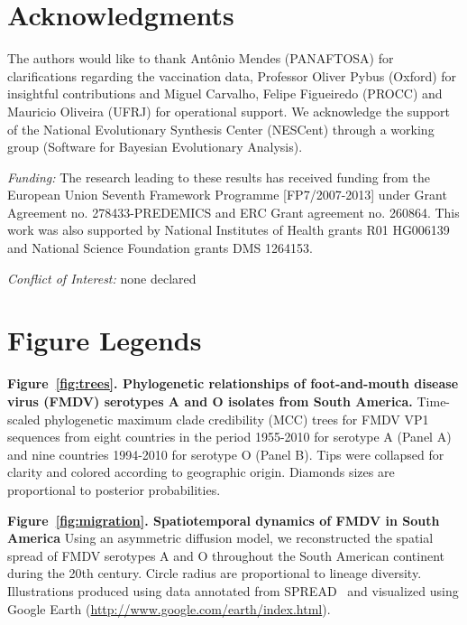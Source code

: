 \documentclass[10pt]{article}
\begin{document}
\section*{Acknowledgments}
The authors would like to thank Ant\^onio Mendes (PANAFTOSA) for clarifications regarding the vaccination data, Professor Oliver Pybus (Oxford) for insightful contributions and Miguel Carvalho, Felipe Figueiredo (PROCC) and Mauricio Oliveira (UFRJ) for operational support.
We acknowledge the support of the National Evolutionary Synthesis Center (NESCent) through a working group (Software for Bayesian Evolutionary Analysis).

\emph{Funding:} The research leading to these results has received funding from the European Union Seventh Framework Programme [FP7/2007-2013] under Grant Agreement no. 278433-PREDEMICS and ERC Grant agreement no. 260864.
This work was also supported by National Institutes of Health grants R01 HG006139 and National Science Foundation grants DMS 1264153.

\emph{Conflict of Interest:} none declared

\newpage

\newpage
\section*{Figure Legends}
{\bf Figure~\ref{fig:trees}. Phylogenetic relationships of foot-and-mouth disease virus (FMDV) serotypes A and O isolates from South America.} Time-scaled phylogenetic maximum clade credibility (MCC) trees for FMDV VP1 sequences from eight countries in the period 1955-2010 for serotype A (Panel A) and nine countries 1994-2010 for serotype O (Panel B).
Tips were collapsed for clarity and colored according to geographic origin.
Diamonds sizes are proportional to posterior probabilities.

{\bf Figure~\ref{fig:migration}. Spatiotemporal dynamics of FMDV in South America} Using an asymmetric diffusion model, we reconstructed the spatial spread of FMDV serotypes A and O throughout the South American continent during the 20th century.
Circle radius are proportional to lineage diversity.
Illustrations produced using data annotated from SPREAD~\cite{spread} and visualized using Google Earth (\url{http://www.google.com/earth/index.html}).
\end{document}

